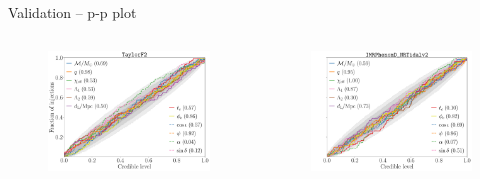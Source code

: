 \documentclass[usenames,dvipsnames,t]{beamer}
\begin{document}
\begin{frame}{Validation -- p-p plot}
  \begin{columns}
    \begin{figure}
      \centering
      \includegraphics[width=\linewidth]{Figures/pp_plot_TF2.pdf}
    \end{figure}
    \begin{figure}
      \centering
      \includegraphics[width=\linewidth]{Figures/pp_plot_NRTv2.pdf}
    \end{figure}
  \end{columns}
  

\end{frame}
\end{document}
